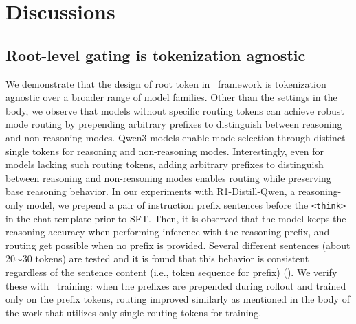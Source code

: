 \newpage
\appendix

\section{Discussions}

\subsection{Root-level gating is tokenization agnostic}

We demonstrate that the design of root token in \Ours~framework is tokenization agnostic over a broader range of model families.
Other than the settings in the body, we observe that models without specific routing tokens  can achieve robust mode routing by prepending arbitrary prefixes to distinguish between reasoning and non-reasoning modes. 
Qwen3 models enable mode selection through distinct single tokens for reasoning and non-reasoning modes. 
Interestingly, even for models lacking such routing tokens, adding arbitrary prefixes to distinguish between reasoning and non-reasoning modes enables routing while preserving base reasoning behavior. 
In our experiments with R1-Distill-Qwen, a reasoning-only model, we prepend a pair of instruction prefix sentences before the \texttt{<think>} in the chat template prior to SFT. 
Then, it is observed that the model keeps the reasoning accuracy when performing inference with the reasoning prefix, and routing get possible when no prefix is provided. 
Several different sentences (about 20${\sim}$30 tokens) are tested and it is found that this behavior is consistent regardless of the sentence content (i.e., token sequence for prefix) (). 
We verify these with \Ours~training: when the prefixes are prepended during rollout and trained only on the prefix tokens, routing improved similarly as mentioned in the body of the work that utilizes only single routing tokens for training. 

